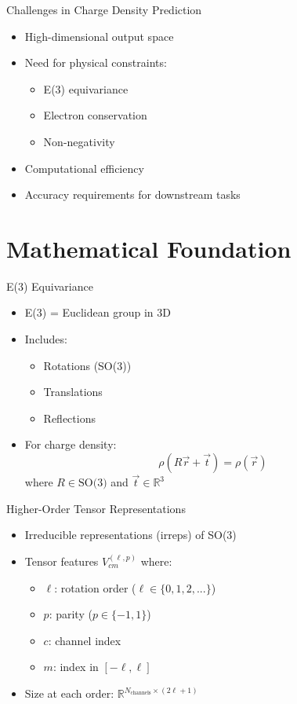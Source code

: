 \begin{frame}{Challenges in Charge Density Prediction}
    \begin{itemize}
        \item High-dimensional output space
        \item Need for physical constraints:
        \begin{itemize}
            \item E(3) equivariance
            \item Electron conservation
            \item Non-negativity
        \end{itemize}
        \item Computational efficiency
        \item Accuracy requirements for downstream tasks
    \end{itemize}
\end{frame}

\section{Mathematical Foundation}

\begin{frame}{E(3) Equivariance}
    \begin{itemize}
        \item E(3) = Euclidean group in 3D
        \item Includes:
        \begin{itemize}
            \item Rotations (SO(3))
            \item Translations
            \item Reflections
        \end{itemize}
        \item For charge density:
        \[
        \rho(R\vec{r} + \vec{t}) = \rho(\vec{r})
        \]
        where $R \in \text{SO(3)}$ and $\vec{t} \in \mathbb{R}^3$
    \end{itemize}
\end{frame}

\begin{frame}{Higher-Order Tensor Representations}
    \begin{itemize}
        \item Irreducible representations (irreps) of SO(3)
        \item Tensor features $V^{(\ell,p)}_{cm}$ where:
        \begin{itemize}
            \item $\ell$: rotation order ($\ell \in \{0,1,2,...\}$)
            \item $p$: parity ($p \in \{-1,1\}$)
            \item $c$: channel index
            \item $m$: index in $[-\ell,\ell]$
        \end{itemize}
        \item Size at each order: $\mathbb{R}^{N_{\text{channels}} \times (2\ell+1)}$
    \end{itemize}
\end{frame}

